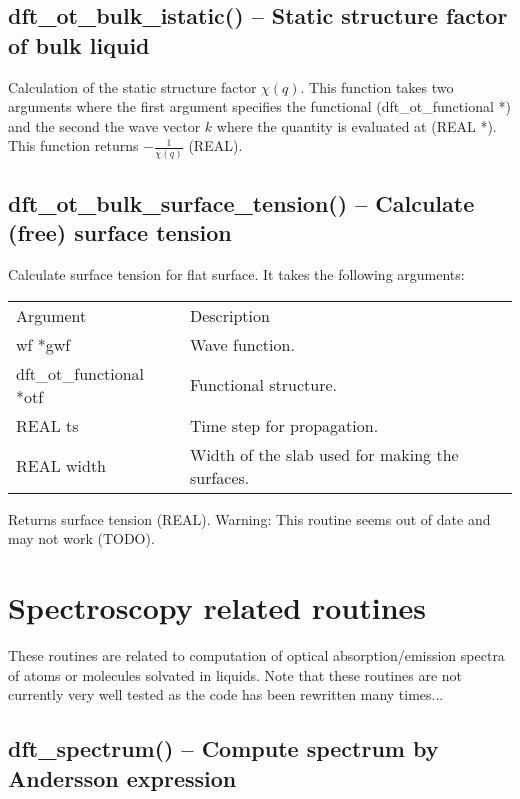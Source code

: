 \documentclass[12pt,letterpaper]{report}
\begin{document}
\subsection{dft\_ot\_bulk\_istatic() -- Static structure factor of bulk liquid}

Calculation of the static structure factor $\chi(q)$. This function takes two arguments where the first argument specifies the functional (dft\_ot\_functional *) and the second the wave vector $k$ where the quantity is evaluated at (REAL *). This function returns $-\frac{1}{\chi(q)}$ (REAL).

\subsection{dft\_ot\_bulk\_surface\_tension() -- Calculate (free) surface tension}

Calculate surface tension for flat surface. It takes the following arguments:
\begin{longtable}{p{} p{}}
Argument & Description\\
\cline{1-2}
wf *gwf & Wave function.\\
dft\_ot\_functional *otf & Functional structure.\\
REAL ts & Time step for propagation.\\
REAL width & Width of the slab used for making the surfaces.\\
\end{longtable}
\noindent
Returns surface tension (REAL). Warning: This routine seems out of date and may not work (TODO).

\section{Spectroscopy related routines}

These routines are related to computation of optical absorption/emission spectra of atoms or molecules solvated in liquids. Note that these routines are not currently very well tested as the code has been rewritten many times...

\subsection{dft\_spectrum() -- Compute spectrum by Andersson expression}
\end{document}
